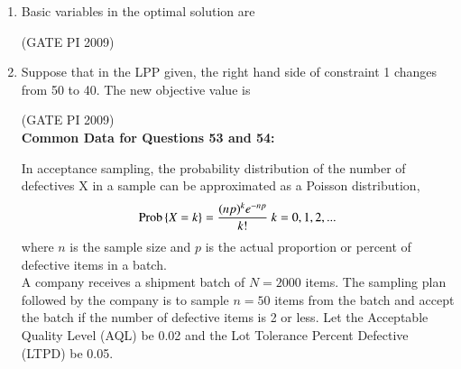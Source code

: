 \documentclass[journal,12pt,onecolumn]{IEEEtran}
\theoremstyle{remark}
\begin{document}
\begin{enumerate}
\item Basic variables in the optimal solution are
\begin{enumerate}
\end{enumerate}
\hfill (GATE PI 2009)
\item Suppose that in the LPP given, the right hand side of constraint 1 changes from 50 to 40. The new objective value is
\begin{enumerate}

\end{enumerate}
\hfill (GATE PI 2009) \\
\textbf{Common Data for Questions 53 and 54:}


In acceptance sampling, the probability distribution of the number of defectives X in a sample can be approximated as a Poisson distribution,\\
$$\text{Prob}\left\{X = k\right\}  = \frac{(np)^k e^{-np}}{k!}\ k=0,1,2,...$$
where $n$ is the sample size and $p$ is the actual proportion or percent of defective items in a batch.\\

A company receives a shipment batch of $N = 2000$ items. The sampling plan followed by the company is to sample $n = 50$ items from the batch and accept the batch if the number of defective items is 2 or less. Let the Acceptable Quality Level (AQL) be 0.02 and the Lot Tolerance Percent Defective (LTPD) be 0.05.



\end{enumerate}
\end{document}
